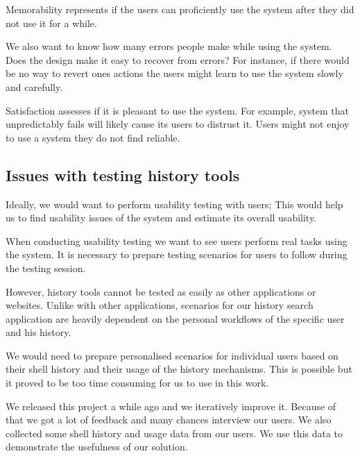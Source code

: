 Memorability represents if the users can proficiently use the system after they did not use it for a while. 

We also want to know how many errors people make while using the system. Does the design make it easy to recover from errors? For instance, if there would be no way to revert ones actions the users might learn to use the system slowly and carefully. 

Satisfaction assesses if it is pleasant to use the system. For example, system that unpredictably fails will likely cause its users to distrust it. Users might not enjoy to use a system they do not find reliable. 


\subsection{Issues with testing history tools}

Ideally, we would want to perform usability testing with users; This would help us to find usability issues of the system and estimate its overall usability.

When conducting usability testing we want to see users perform real tasks using the system. It is necessary to prepare testing scenarios for users to follow during the testing session.

However, history tools cannot be tested as easily as other applications or websites.
Unlike with other applications, scenarios for our history search application are heavily dependent on the personal workflows of the specific user and his history.


We would need to prepare personalised scenarios for individual users based on their shell history and their usage of the history mechanisms.
This is possible but it proved to be too time consuming for us to use in this work.

We released this project a while ago and we iteratively improve it. Because of that we got a lot of feedback and many chances interview our users. We also collected some shell history and usage data from our users. We use this data to demonstrate the usefulness of our solution.

